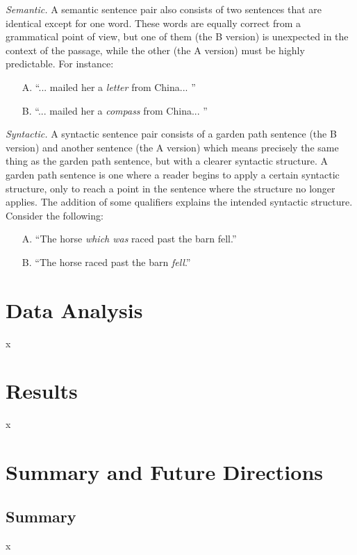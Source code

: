 \documentclass[11pt,letterpaper]{article}
\begin{document}
\textit{Semantic.} A semantic sentence pair also consists of two sentences that are identical except for one word. These words are equally correct from a grammatical point of view, but one of them (the B version) is unexpected in the context of the passage, while the other (the A version) must be highly predictable. For instance:
\begin{itemize}[noitemsep, nolistsep]
\item[A.] ``... mailed her a \textit{letter} from China... ''
\item[B.] ``... mailed her a \textit{compass} from China... ''
\end{itemize}

\textit{Syntactic.} A syntactic sentence pair consists of a garden path sentence (the B version) and another sentence (the A version) which means precisely the same thing as the garden path sentence, but with a clearer syntactic structure. A garden path sentence is one where a reader begins to apply a certain syntactic structure, only to reach a point in the sentence where the structure no longer applies. The addition of some qualifiers explains the intended syntactic structure. Consider the following:
\begin{itemize}[noitemsep, nolistsep]
\item[A.] ``The horse \textit{which was} raced past the barn fell.''
\item[B.] ``The horse raced past the barn \textit{fell}.''
\end{itemize}

\section{Data Analysis}

x

\section{Results}

x

\section{Summary and Future Directions}

\subsection{Summary}

x
\end{document}
